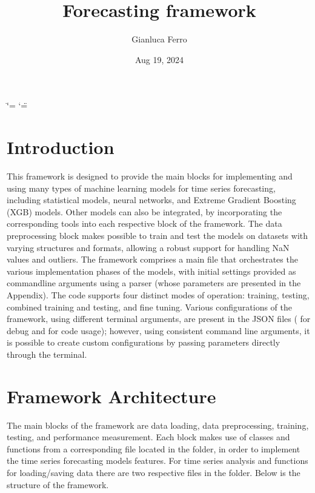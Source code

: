 \documentclass[letterpaper,10pt,english]{sphinxmanual}
\title{Forecasting framework}
\date{Aug 19, 2024}
\author{Gianluca Ferro}
\begin{document}
\ifdefined\shorthandoff
  \ifnum\catcode`\=\string=\active\shorthandoff{=}\fi
  \ifnum\catcode`\"=\active{}\fi
\fi

\pagestyle{empty}
\sphinxmaketitle
\pagestyle{plain}
\sphinxtableofcontents
\pagestyle{normal}
\label{\detokenize{index::doc}}



\chapter{Introduction}
\label{\detokenize{index:introduction}}
\sphinxAtStartPar
This framework is designed to provide the main blocks for implementing and using many types of machine learning models for time series forecasting, including
statistical models, neural networks, and Extreme Gradient Boosting (XGB) models.
Other models can also be integrated, by incorporating the corresponding tools into each respective block of the framework.
The data preprocessing block makes possible to train and test the models on datasets with varying structures and formats, allowing a robust
support for handling NaN values and outliers. The framework comprises a main file that orchestrates the various implementation phases of the models, with initial settings provided as
command\sphinxhyphen{}line arguments using a parser (whose parameters are presented in the Appendix).
The code supports four distinct modes of operation: training, testing, combined training and testing, and fine tuning.
Various configurations of the framework, using different terminal arguments, are present in the JSON files ( for debug and  for
code usage); however, using consistent command line arguments, it is possible to create custom configurations
by passing parameters directly through the terminal.


\chapter{Framework Architecture}
\label{\detokenize{index:framework-architecture}}
\sphinxAtStartPar
The main blocks of the framework are data loading, data preprocessing, training, testing, and performance measurement.
Each block makes use of classes and functions from a corresponding file located in the  folder,
in order to implement the time series forecasting models features.
For time series analysis and functions for loading/saving data there are two respective files in the  folder.
Below is the structure of the framework.
\end{document}
